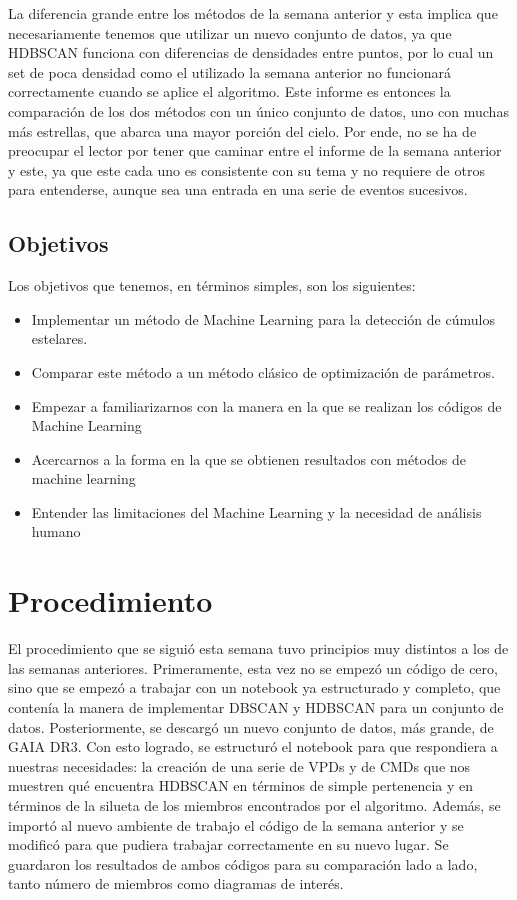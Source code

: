 \documentclass[10pt,twocolumn]{article}
\begin{document}
La diferencia grande entre los métodos de la semana anterior y esta implica que necesariamente tenemos que
utilizar un nuevo conjunto de datos, ya que HDBSCAN funciona con diferencias de densidades entre puntos, 
por lo cual un set de poca densidad como el utilizado la semana anterior no funcionará correctamente 
cuando se aplice el algoritmo. Este informe es entonces la comparación de los dos métodos con un 
único conjunto de datos, uno con muchas más estrellas, que abarca una mayor porción del cielo. Por ende, 
no se ha de preocupar el lector por tener que caminar entre el informe de la semana anterior y este, 
ya que este cada uno es consistente con su tema y no requiere de otros para entenderse, aunque sea 
una entrada en una serie de eventos sucesivos. 

\subsection{Objetivos}

Los objetivos que tenemos, en términos simples, son los siguientes:
\begin{itemize}
    \item Implementar un método de Machine Learning para la detección de cúmulos estelares. 
    \item Comparar este método a un método clásico de optimización de parámetros.
    \item Empezar a familiarizarnos con la manera en la que se realizan los códigos de Machine Learning
    \item Acercarnos a la forma en la que se obtienen resultados con métodos de machine learning 
    \item Entender las limitaciones del Machine Learning y la necesidad de análisis humano
\end{itemize}


\section{Procedimiento}

El procedimiento que se siguió esta semana tuvo principios muy distintos a los de las semanas anteriores. 
Primeramente, esta vez no se empezó un código de cero, sino que se empezó a trabajar con un notebook 
ya estructurado y completo, que contenía la manera de implementar DBSCAN y HDBSCAN para un conjunto de datos.
Posteriormente, se descargó un nuevo conjunto de datos, más grande, de GAIA DR3. Con esto logrado, 
se estructuró el notebook para que respondiera a nuestras necesidades: la creación de una serie de VPDs
y de CMDs que nos muestren qué encuentra HDBSCAN en términos de simple pertenencia y en términos de la
silueta de los miembros encontrados por el algoritmo. Además, se importó al nuevo ambiente de trabajo
el código de la semana anterior y se modificó para que pudiera trabajar correctamente en su nuevo lugar. 
Se guardaron los resultados de ambos códigos para su comparación lado a lado, tanto número de miembros
como diagramas de interés. 
\end{document}
